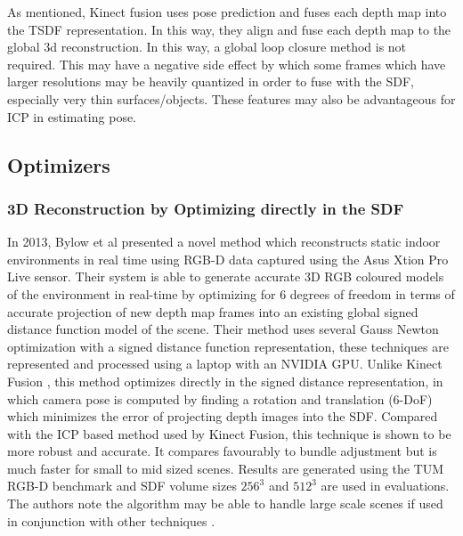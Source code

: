 As mentioned, Kinect fusion uses pose prediction and fuses each depth map into the TSDF representation. In this way, they align and fuse each depth map to the global 3d reconstruction. In this way, a global loop closure method is not required. This may have a negative side effect by which some frames which have larger resolutions may be heavily quantized in order to fuse with the SDF, especially very thin surfaces/objects. These features may also be advantageous for ICP in estimating pose. 



\subsection{Optimizers}

\subsubsection{3D Reconstruction by Optimizing directly in the SDF}

In 2013, Bylow et al \cite{Bylow13Real} presented a novel method which reconstructs static indoor environments in real time using RGB-D data captured using the Asus Xtion Pro Live sensor. Their system is able to generate accurate 3D RGB coloured models of the environment in real-time by optimizing for 6 degrees of freedom in terms of accurate projection of new depth map frames into an existing global signed distance function model of the scene. Their method uses several Gauss Newton optimization with a signed distance function representation, these techniques are represented and processed using a laptop with an NVIDIA GPU. Unlike Kinect Fusion \cite{Newcombe11Kinectfusion}, this method optimizes directly in the signed distance representation, in which camera pose is computed by finding a rotation and translation (6-DoF) which minimizes the error of projecting depth images into the SDF. Compared with the ICP based method used by Kinect Fusion, this technique is shown to be more robust and accurate. It compares favourably to bundle adjustment but is much faster for small to mid sized scenes. Results are generated using the TUM RGB-D benchmark and SDF volume sizes $256^3$ and $512^3$ are used in evaluations. The authors note the algorithm may be able to handle large scale scenes if used in conjunction with other techniques \cite{Kaess11Isam2,Kummerle11G}. \\

